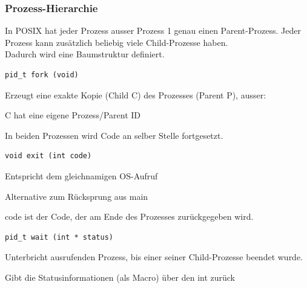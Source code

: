 \begin{multicols*}{5}
	 \vspace{-7pt}
	\subsubsection{Prozess-Hierarchie}
		In POSIX hat jeder Prozess ausser Prozess 1 genau einen Parent-Prozess. Jeder Prozess kann zusätzlich beliebig viele Child-Prozesse haben.\\
		Dadurch wird eine Baumstruktur definiert. 


		\vspace{-5pt}
		\begin{lstlisting}
pid_t fork (void)
		\end{lstlisting}
		\vspace{-5pt}
		\begin{compactitem}[$\bullet$]
			\item Erzeugt eine exakte Kopie (Child C) des Prozesses (Parent P), ausser:
			\item C hat eine eigene Prozess/Parent ID
			\item In beiden Prozessen wird Code an selber Stelle fortgesetzt.
		\end{compactitem}
		
		\vspace{-5pt}
	
		\begin{lstlisting}
void exit (int code)
		\end{lstlisting}
		\vspace{-5pt}
		\begin{compactitem}[$\bullet$]
			\item Entspricht dem gleichnamigen OS-Aufruf
			\item Alternative zum Rücksprung aus main
			\item code ist der Code, der am Ende des Prozesses zurückgegeben wird.
		\end{compactitem}
		
		\vspace{-5pt}

		\begin{lstlisting}
pid_t wait (int * status)
		\end{lstlisting}
		\vspace{-5pt}
		\begin{compactitem}[$\bullet$]
			\item Unterbricht ausrufenden Prozess, bis einer seiner Child-Prozesse beendet wurde.
			\item Gibt die Statusinformationen (als Macro) über den int zurück
		\end{compactitem}
		

\end{multicols*}

